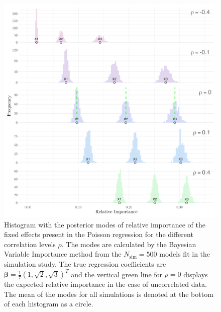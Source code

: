 \begin{figure}[H]
  \centering
  \includegraphics[width=1\linewidth]{Figures/Simulation study/Fixed_combined_poisson.png}
  \caption[Relative importance of the fixed effects in Poisson GLMM]{Histogram with the posterior modes of relative importance of the fixed effects present in the Poisson regression for the different correlation levels $\rho$. The modes are calculated by the Bayesian Variable Importance method from the $N_{\text{sim}}=500$ models fit in the simulation study. The true regression coefficients are $\boldsymbol{\beta}=\frac{1}{7}(1, \sqrt{2}, \sqrt{3})^T$ and the vertical green line for $\rho=0$ displays the expected relative importance in the case of uncorrelated data. The mean of the modes for all simulations is denoted at the bottom of each histogram as a circle.}
  \label{fig:fixed_combined_poisson}
\end{figure}
